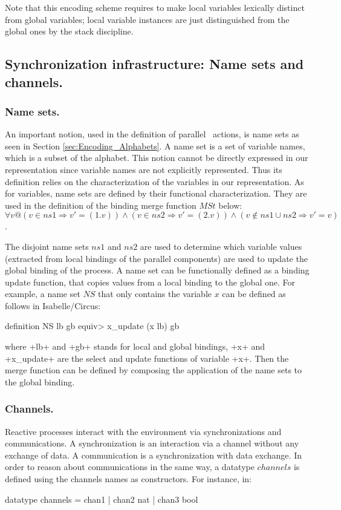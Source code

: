 \documentclass[11pt,a4paper]{article}
\begin{document}
Note that this encoding scheme requires to make local variables lexically distinct from global variables; local
variable instances are just distinguished from the global ones by the stack discipline. 

\subsection{Synchronization infrastructure: Name sets and channels.}
\label{Section:NSandCS}
\subsubsection{Name sets.}
An important notion, used in the definition of parallel \Circus\ actions, is name sets
as seen in Section \ref{sec:Encoding_Alphabets}. A name set is a set of variable names, which is a subset of 
the alphabet. This notion cannot be directly expressed in our representation since variable names 
are not explicitly represented. %
Thus its definition relies on the characterization of the variables in our representation. As for 
variables, name sets are defined by their functional 
characterization. They are used in the definition of the binding merge function $MSt$ below:\\
{\footnotesize $\forall v @ (v \in ns1 \Rightarrow v' = (1.v)) \land (v \in ns2 \Rightarrow v' = (2.v)) 
\land (v \notin ns1 \cup ns2 \Rightarrow v' = v)$}.

The disjoint name sets $ns1$ and $ns2$ are used to determine which variable values (extracted from
local bindings of the parallel components) are used to update the global binding of the process. 
A name set can be functionally defined as a binding update function, that 
copies values from a local binding to the global one. For example, a name set $NS$ that only 
contains the variable $x$ can be defined as follows in Isabelle/Circus:
\begin{isar}
definition NS lb gb \<equiv>    x_update (x lb) gb
\end{isar}

\noindent where  \inlineisar+lb+ and \inlineisar+gb+ stands for local and global bindings, 
\inlineisar+x+ and \inlineisar+x_update+ are the select and update functions of variable 
\inlineisar+x+. Then the merge function can be defined by composing the application of the name 
sets to the global binding.

\subsubsection{Channels.}
Reactive processes interact with the environment via synchronizations and communications. A 
synchronization is an interaction via a channel without any exchange of data. A communication is a 
synchronization with data exchange. In order to reason about communications in the same way, 
a datatype $channels$ is defined using the channels names as constructors.
For instance, in:
\begin{isar}
datatype channels = chan1 | chan2 nat | chan3 bool
\end{isar}
\end{document}
